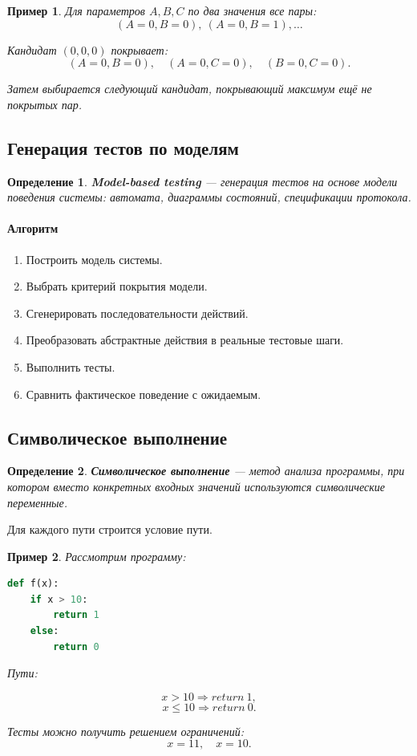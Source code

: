 \documentclass[12pt,a4paper]{article}
\newtheorem{definition}{Определение}
\newtheorem{example}{Пример}
\begin{document}
\begin{example}
Для параметров $A,B,C$ по два значения все пары:
\[
(A=0,B=0),\ (A=0,B=1),\dots
\]

Кандидат $(0,0,0)$ покрывает:
\[
(A=0,B=0),\quad (A=0,C=0),\quad (B=0,C=0).
\]

Затем выбирается следующий кандидат, покрывающий максимум ещё не покрытых пар.
\end{example}

\subsection{Генерация тестов по моделям}

\begin{definition}
\textbf{Model-based testing} --- генерация тестов на основе модели поведения системы: автомата, диаграммы состояний, спецификации протокола.
\end{definition}

\paragraph{Алгоритм}

\begin{enumerate}
    \item Построить модель системы.
    \item Выбрать критерий покрытия модели.
    \item Сгенерировать последовательности действий.
    \item Преобразовать абстрактные действия в реальные тестовые шаги.
    \item Выполнить тесты.
    \item Сравнить фактическое поведение с ожидаемым.
\end{enumerate}

\subsection{Символическое выполнение}

\begin{definition}
\textbf{Символическое выполнение} --- метод анализа программы, при котором вместо конкретных входных значений используются символические переменные.
\end{definition}

Для каждого пути строится условие пути.

\begin{example}
Рассмотрим программу:

\begin{lstlisting}[language=Python]
def f(x):
    if x > 10:
        return 1
    else:
        return 0
\end{lstlisting}

Пути:

\[
x>10 \Rightarrow return\ 1,
\]
\[
x\leq 10 \Rightarrow return\ 0.
\]

Тесты можно получить решением ограничений:
\[
x=11,\quad x=10.
\]
\end{example}
\end{document}
